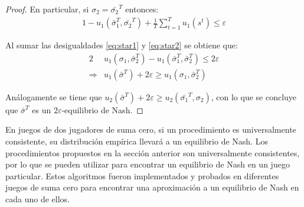 \begin{proof}
En particular, si $\sigma_2 = \bar{\sigma_2}^T$ entonces:
\begin{alignat}{1}
\label{eq:star2}
-u_1(\bar{\sigma}_1^T, \bar{\sigma_2}^T) + \frac{1}{T} \sum_{t=1}^T u_1(s^t) \leq \varepsilon
\end{alignat}

Al sumar las desigualdades \ref{eq:star1} y \ref{eq:star2} se obtiene que:
\begin{alignat}{2}
& u_1(\sigma_1, \bar{\sigma}_2^T) - u_1(\bar{\sigma}_1^T, \bar{\sigma}_2^T) \leq 2\varepsilon \\
\Rightarrow & u_1(\bar{\sigma}^T) + 2\varepsilon \geq u_1(\sigma_1, \bar{\sigma}_2^T)
\end{alignat}

Análogamente se tiene que $u_2(\bar{\sigma}^T) + 2\varepsilon \geq u_2(\bar{\sigma_1}^T, \sigma_2)$, con lo que se concluye que $\bar{\sigma}^T$ es un $2\varepsilon$-equilibrio de Nash.
\end{proof}

En juegos de dos jugadores de suma cero, si un procedimiento es universalmente consistente, su distribución empírica llevará a un equilibrio de Nash. Los procedimientos propuestos en la sección anterior son universalmente consistentes, por lo que se pueden utilizar para encontrar un equilibrio de Nash en un juego particular. Estos algoritmos fueron implementados y probados en diferentes juegos de suma cero para encontrar una aproximación a un equilibrio de Nash en cada uno de ellos.


